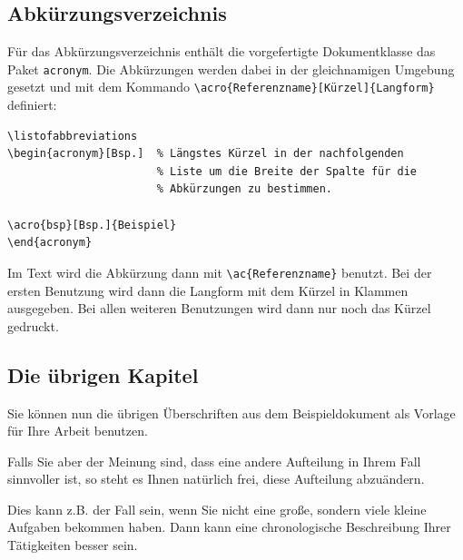 \documentclass[pdftex,abstracton,a4paper]{scrartcl}
\begin{document}



\subsection{Abkürzungsverzeichnis}
Für das Abkürzungsverzeichnis enthält die vorgefertigte Dokumentklasse das Paket
\verb+acronym+. Die Abkürzungen werden dabei in der gleichnamigen Umgebung gesetzt 
und mit dem Kommando \verb+\acro{Referenzname}[Kürzel]{Langform}+ definiert:

\begin{verbatim}
\listofabbreviations
\begin{acronym}[Bsp.]  % Längstes Kürzel in der nachfolgenden
                       % Liste um die Breite der Spalte für die
                       % Abkürzungen zu bestimmen.

\acro{bsp}[Bsp.]{Beispiel}
\end{acronym}
\end{verbatim}

Im Text wird die Abkürzung dann mit \verb+\ac{Referenzname}+ benutzt.
Bei der ersten Benutzung wird dann die Langform mit dem Kürzel in Klammen 
ausgegeben. Bei allen weiteren Benutzungen wird dann nur noch das Kürzel gedruckt. 


\subsection{Die übrigen Kapitel}

Sie können nun die übrigen Überschriften aus dem Beispieldokument als Vorlage für Ihre Arbeit benutzen.

Falls Sie aber der Meinung sind, dass eine andere Aufteilung in Ihrem Fall sinnvoller ist, so steht es Ihnen natürlich frei, diese Aufteilung abzuändern.

Dies kann z.B. der Fall sein, wenn Sie nicht eine große, sondern viele kleine Aufgaben bekommen haben. Dann kann eine chronologische Beschreibung Ihrer Tätigkeiten besser sein.
\end{document}
